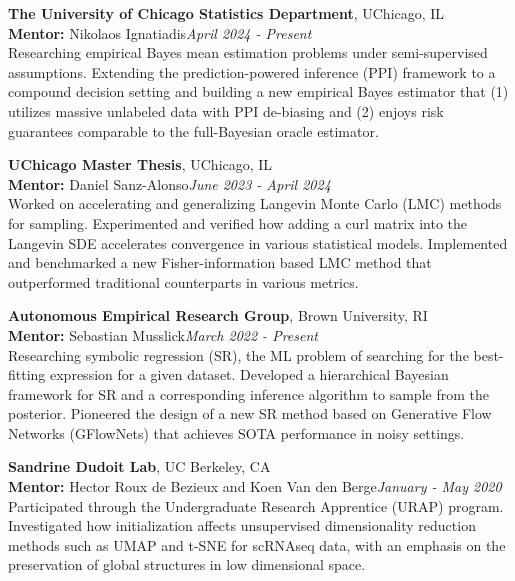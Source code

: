 \documentclass[10pt,letterpaper]{article}
\newlength{\labw}\setlength{\labw}{1.15in}
\newenvironment{sect}[1]{%
  \begin{list}{}{\setlength{\leftmargin}{\labw}\setlength{\labelwidth}{\labw}%
  \setlength{\labelsep}{0pt}\setlength{\itemsep}{0pt}\setlength{\topsep}{0pt}\setlength{\parsep}{0pt}}%
  \item[{\raisebox{0pt}[0pt][0pt]{\parbox[t]{\labw}{\bfseries\raggedright\MakeUppercase{#1}}}}]}%
  {\end{list}\vspace{1.1em}}
\begin{document}
\begin{sect}{Research\\Experience}
\textbf{The University of Chicago Statistics Department}, UChicago, IL\\
\textbf{Mentor:} Nikolaos Ignatiadis\hfill\textit{April 2024 - Present}\\
Researching empirical Bayes mean estimation problems under semi-supervised assumptions. Extending the prediction-powered inference (PPI) framework to a compound decision setting and building a new empirical Bayes estimator that (1) utilizes massive unlabeled data with PPI de-biasing and (2) enjoys risk guarantees comparable to the full-Bayesian oracle estimator.\par\vspace{0.7em}
\textbf{UChicago Master Thesis}, UChicago, IL\\
\textbf{Mentor:} Daniel Sanz-Alonso\hfill\textit{June 2023 - April 2024}\\
Worked on accelerating and generalizing Langevin Monte Carlo (LMC) methods for sampling. Experimented and verified how adding a curl matrix into the Langevin SDE accelerates convergence in various statistical models. Implemented and benchmarked a new Fisher-information based LMC method that outperformed traditional counterparts in various metrics.\par\vspace{0.7em}
\textbf{Autonomous Empirical Research Group}, Brown University, RI\\
\textbf{Mentor:} Sebastian Musslick\hfill\textit{March 2022 - Present}\\
Researching symbolic regression (SR), the ML problem of searching for the best-fitting expression for a given dataset. Developed a hierarchical Bayesian framework for SR and a corresponding inference algorithm to sample from the posterior. Pioneered the design of a new SR method based on Generative Flow Networks (GFlowNets) that achieves SOTA performance in noisy settings.\par\vspace{0.7em}
\textbf{Sandrine Dudoit Lab}, UC Berkeley, CA\\
\textbf{Mentor:} Hector Roux de Bezieux and Koen Van den Berge\hfill\textit{January - May 2020}\\
Participated through the Undergraduate Research Apprentice (URAP) program. Investigated how initialization affects unsupervised dimensionality reduction methods such as UMAP and t-SNE for scRNAseq data, with an emphasis on the preservation of global structures in low dimensional space.
\end{sect}
\end{document}
